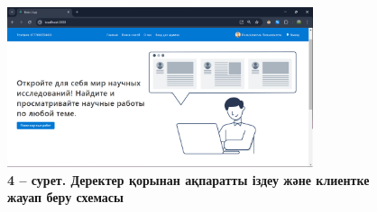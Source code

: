 \begin{figure}[H]
	\centering
	\includegraphics[height=0.5\textwidth, width=0.8\textwidth]{assets/145}
	\caption*{\bfseries 4 -- сурет. Деректер қорынан ақпаратты іздеу және клиентке жауап
  беру схемасы}
\end{figure}

